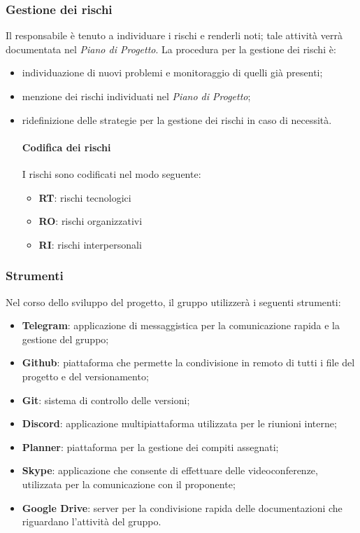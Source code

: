 \subsubsection{Gestione dei rischi}
Il responsabile è tenuto a individuare i rischi e renderli noti; tale attività verrà documentata nel \textit{Piano di Progetto}. La procedura per la gestione dei rischi è: 
\begin{itemize}
\item individuazione di nuovi problemi e monitoraggio di quelli già presenti;
\item menzione dei rischi individuati nel \textit{Piano di Progetto}; 
\item ridefinizione delle strategie per la gestione dei rischi in caso di necessità.

\paragraph{Codifica dei rischi} 
I rischi sono codificati nel modo seguente: 
\begin{itemize}
\item  \textbf{RT}: rischi tecnologici 
\item \textbf{RO}: rischi organizzativi
\item   \textbf{RI}: rischi interpersonali
\end{itemize}
\end{itemize}
\subsubsection{Strumenti}
Nel corso dello sviluppo del progetto, il gruppo utilizzerà i seguenti strumenti: 
\begin{itemize}
\item \textbf{Telegram\glo}: applicazione di messaggistica per la comunicazione rapida e la gestione del gruppo; 
\item \textbf{Github\glo}: piattaforma che permette la condivisione in remoto di tutti i file del progetto e del versionamento;
\item \textbf{Git\glo}: sistema di controllo delle versioni;
\item \textbf{Discord}: applicazione multipiattaforma utilizzata per le riunioni interne;
\item \textbf{Planner}: piattaforma per la gestione dei compiti assegnati;
\item \textbf{Skype}: applicazione che consente di effettuare delle videoconferenze, utilizzata per la comunicazione con il proponente;
\item \textbf{Google Drive}: server per la condivisione rapida delle documentazioni che riguardano l'attività del gruppo.
\end{itemize}